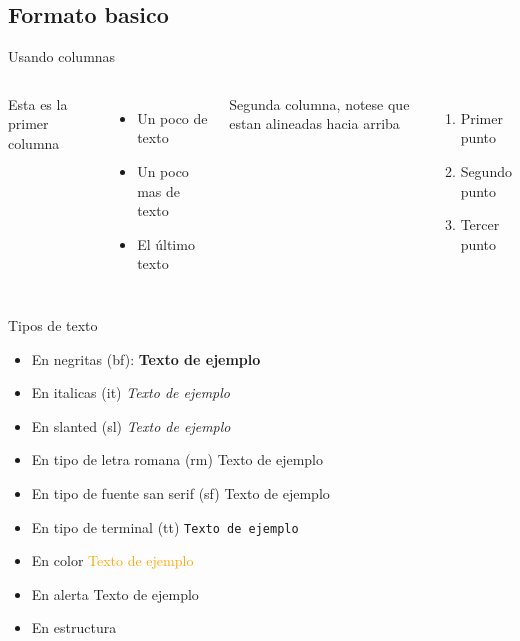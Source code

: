 \subsection{Formato basico} 
\begin{frame}{Usando columnas}
\begin{columns}
     Esta es la primer columna
     \begin{itemize}
         \item Un poco de texto
         \item Un poco mas de texto
         \item El último texto
     \end{itemize}
     Segunda columna, notese que estan alineadas hacia arriba
     \begin{enumerate}
         \item Primer punto
         \item Segundo punto
         \item Tercer punto
     \end{enumerate}
\end{columns}
\end{frame}

\begin{frame}{Tipos de texto}
  \begin{itemize}
    \item En negritas (bf):  \textbf{Texto de ejemplo}
    \item En italicas (it) \textit{Texto de ejemplo}
    \item En slanted (sl) \textsl{Texto de ejemplo}
    \item En tipo de letra romana (rm) \textrm{Texto de ejemplo}
    \item En tipo de fuente san serif (sf) \textsf{Texto de ejemplo}
    \item En tipo de terminal (tt) \texttt{Texto de ejemplo}
    \item En color \textcolor{orange}{Texto de ejemplo}
    \item En alerta \alert{Texto de ejemplo}
    \item En estructura 
  \end{itemize}
\end{frame}

